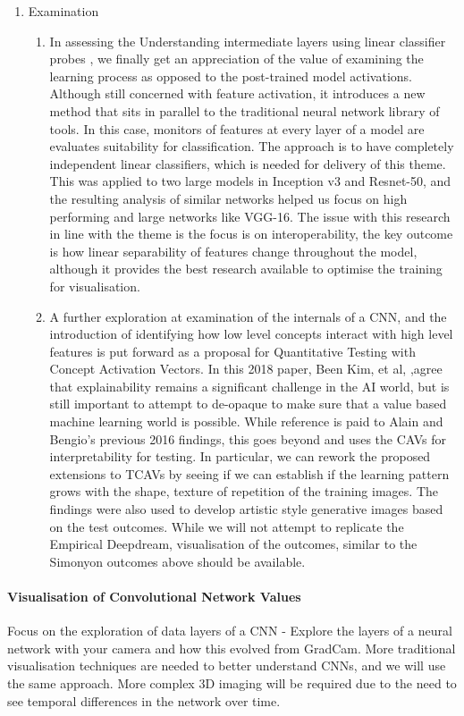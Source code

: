 \begin{enumerate}
    \item Examination
    \begin{enumerate}
        \item In assessing the Understanding intermediate layers using linear classifier probes \cite{alain_understanding_2018} , we finally get an appreciation of the value of examining the learning process as opposed to the post-trained model activations. Although still concerned with feature activation, it introduces a new method that sits in parallel to the traditional neural network library of tools. In this case, monitors of features at every layer of a model are evaluates suitability for classification. The approach is to have completely independent linear classifiers, which is needed for delivery of this theme. This was applied to two large models in Inception v3 and Resnet-50, and the resulting analysis of similar networks helped us focus on high performing and large networks like VGG-16. The issue with this research in line with the theme is the focus is on interoperability, the key outcome is how linear separability of features change throughout the model, although it provides the best research available to optimise the training for visualisation.
        \item A further exploration at examination of the internals of a CNN, and the introduction of identifying how low level concepts interact with high level features is put forward as a proposal for Quantitative Testing with Concept Activation Vectors. In this 2018 paper, Been Kim, et al, ,agree that explainability remains a significant challenge in the AI world, but is still important to attempt to de-opaque to make sure that a value based machine learning world is possible. While reference is paid to Alain and Bengio’s previous 2016 findings, this goes beyond and uses the CAVs for interpretability for testing. In particular, we can rework the proposed extensions to TCAVs by seeing if we can establish if the learning pattern grows with the shape, texture of repetition of the training images.  The findings were also used to develop artistic style generative images based on the test outcomes. While we will not attempt to replicate the Empirical Deepdream, visualisation of the outcomes, similar to the Simonyon outcomes above should be available.
    \end{enumerate}
\end{enumerate}

\paragraph{Visualisation of Convolutional Network Values}
Focus on the exploration of data layers of a CNN - Explore the layers of a neural network with your camera and how this evolved from GradCam. More traditional visualisation techniques are needed to better understand CNNs, and we will use the same approach. More complex 3D imaging will be required due to the need to see temporal differences in the network over time.

